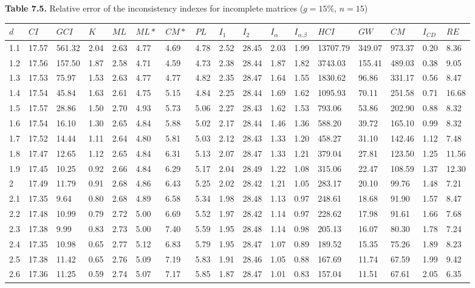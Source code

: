 \newpage\textbf{Table 7.5.} Relative error of the inconsistency indexes for incomplete matrices ($g=15\%$, $n=15$)
\begin{adjustbox}{angle=90}
  \begin{center}
    \begin{tabular}{|l|llllllllllllllll|}
      \hline $d$ &
$CI$&$GCI$&$K$&$ML$&$ML*$&$CM*$&$PL$&$I_1$&$I_2$&$I_{\alpha}$&$I_{\alpha.\beta}$&$HCI$&$GW$&$CM$&$I_{CD}$&$RE$\\ \hline \hline
1.1&17.57&561.32&2.04&2.63&4.77&4.69&4.78&2.52&28.45&2.03&1.99&13707.79&349.07&973.37&0.20&8.36  \\ 
1.2&17.56&157.50&1.87&2.58&4.71&4.59&4.73&2.38&28.44&1.87&1.82&3743.03&155.41&489.03&0.38&9.05  \\ 
1.3&17.53&75.97&1.53&2.63&4.77&4.77&4.82&2.35&28.47&1.64&1.55&1830.62&96.86&331.17&0.56&8.47  \\ 
1.4&17.54&45.84&1.63&2.61&4.75&5.15&4.84&2.25&28.44&1.69&1.62&1095.93&70.11&251.58&0.71&16.68  \\ 
1.5&17.57&28.86&1.50&2.70&4.93&5.73&5.06&2.27&28.43&1.62&1.53&793.06&53.86&202.90&0.88&8.32  \\ 
1.6&17.54&16.10&1.30&2.65&4.84&5.88&5.02&2.17&28.44&1.46&1.36&588.20&39.72&165.10&0.99&8.32  \\ 
1.7&17.52&14.44&1.11&2.64&4.80&5.81&5.03&2.12&28.43&1.33&1.20&458.27&31.10&142.46&1.12&7.48  \\ 
1.8&17.47&12.65&1.12&2.65&4.84&6.31&5.13&2.07&28.47&1.33&1.21&379.04&27.81&123.50&1.25&11.56  \\ 
1.9&17.45&10.25&0.92&2.66&4.84&6.29&5.17&2.04&28.49&1.22&1.08&315.06&22.47&108.59&1.37&12.30  \\ 
2&17.49&11.79&0.91&2.68&4.86&6.43&5.25&2.02&28.42&1.21&1.05&283.17&20.10&99.76&1.48&7.21  \\ 
2.1&17.35&9.64&0.80&2.68&4.89&6.58&5.34&1.98&28.48&1.13&0.97&248.61&18.68&91.90&1.57&8.47  \\ 
2.2&17.48&10.99&0.79&2.72&5.00&6.69&5.52&1.97&28.42&1.14&0.97&228.62&17.98&91.61&1.66&7.68  \\ 
2.3&17.38&9.99&0.83&2.73&5.00&7.40&5.59&1.95&28.48&1.14&0.98&205.13&16.07&80.30&1.78&7.24  \\ 
2.4&17.35&10.98&0.65&2.77&5.12&6.83&5.79&1.95&28.47&1.07&0.89&189.52&15.35&75.26&1.89&8.23  \\ 
2.5&17.38&11.42&0.65&2.76&5.09&7.19&5.83&1.91&28.46&1.05&0.88&167.69&11.74&67.59&1.99&9.42  \\ 
2.6&17.36&11.25&0.59&2.74&5.07&7.17&5.85&1.87&28.47&1.01&0.83&157.04&11.51&67.61&2.05&6.35  \\ 

\end{tabular}
\end{center}
\end{adjustbox}
